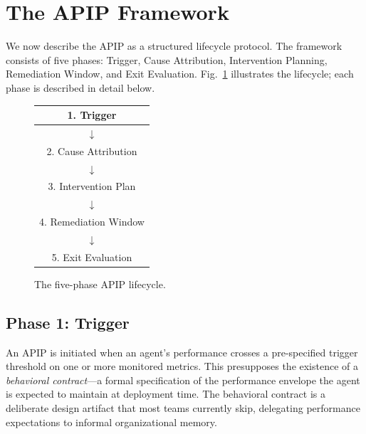 \section{The APIP Framework}
\label{sec:framework}

We now describe the APIP as a structured lifecycle protocol. The framework
consists of five phases: Trigger, Cause Attribution, Intervention Planning,
Remediation Window, and Exit Evaluation. Fig.~\ref{fig:lifecycle} illustrates
the lifecycle; each phase is described in detail below.

\begin{figure}[t]
  \centering
  \footnotesize
  \setlength{\tabcolsep}{3pt}
  \renewcommand{\arraystretch}{1.3}
  \begin{tabular}{@{}|c|c|c|@{}}
    \hline
    \multicolumn{3}{|c|}{1. Trigger} \\
    \hline
    \multicolumn{3}{|c|}{$\downarrow$} \\
    \multicolumn{3}{|c|}{2. Cause Attribution} \\
    \hline
    \multicolumn{3}{|c|}{$\downarrow$} \\
    \multicolumn{3}{|c|}{3. Intervention Plan} \\
    \hline
    \multicolumn{3}{|c|}{$\downarrow$} \\
    \multicolumn{3}{|c|}{4. Remediation Window} \\
    \hline
    \multicolumn{3}{|c|}{$\downarrow$} \\
    \multicolumn{3}{|c|}{5. Exit Evaluation} \\
    \hline
  \end{tabular}
  \caption{The five-phase APIP lifecycle.}
  \label{fig:lifecycle}
\end{figure}

\subsection{Phase 1: Trigger}
\label{subsec:trigger}

An APIP is initiated when an agent's performance crosses a pre-specified
trigger threshold on one or more monitored metrics. This presupposes the
existence of a \emph{behavioral contract}---a formal specification of the
performance envelope the agent is expected to maintain at deployment time. The
behavioral contract is a deliberate design artifact that most teams currently
skip, delegating performance expectations to informal organizational memory.

